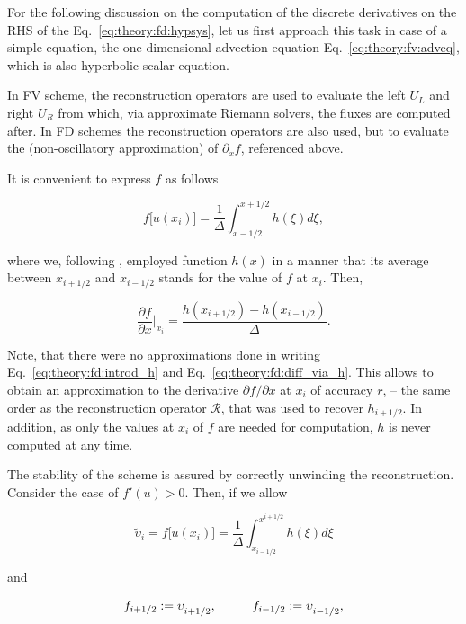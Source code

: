 For the following discussion on the computation of the discrete derivatives on the \ac{RHS} of the Eq.~\eqref{eq:theory:fd:hypsys}, let us first approach this task in case of a simple equation, the one-dimensional advection equation Eq.~\eqref{eq:theory:fv:adveq}, which is also hyperbolic scalar equation. 

In \ac{FV} scheme, the reconstruction operators are used to evaluate the left $U_L$ and right $U_R$ from which, via approximate Riemann solvers, the fluxes are computed after. In \ac{FD} schemes the reconstruction operators are also used, but to evaluate the (non-oscillatory approximation) of $\partial_x f$, referenced above. 

It is convenient to express $f$ as follows

\begin{equation}
f\big[u(x_i)\big] = \frac{1}{\Delta}\int_{x-1/2}^{x+1/2}h(\xi)d\xi,
\label{eq:theory:fd:introd_h}
\end{equation}

where we, following \citet{Shu:1988}, employed function $h(x)$ in a manner that its average between $x_{i+1/2}$ and $x_{i-1/2}$ stands for the value of $f$ at $x_i$. Then, 

\begin{equation}
\frac{\partial f}{\partial x}\Big|_{x_i} = \frac{h(x_{i+1/2}) - h(x_{i-1/2})}{\Delta}.
\label{eq:theory:fd:diff_via_h}
\end{equation}

Note, that there were no approximations done in writing Eq.~\eqref{eq:theory:fd:introd_h} and Eq.~\eqref{eq:theory:fd:diff_via_h}. This allows to obtain an approximation to the derivative $\partial f/\partial x$ at $x_i$ of accuracy $r$, -- the same order as the reconstruction operator $\mathcal{R}$, that was used to recover $h_{i+1/2}$. In addition, as only the values at $x_i$ of $f$ are needed for computation, $h$ is never computed at any time. 

The stability of the scheme is assured by correctly unwinding the reconstruction. 
Consider the case of $f'(u)>0$. 
Then, if we allow

\begin{equation}
\widetilde{\upsilon}_i = f\big[u(x_i)\big] = \frac{1}{\Delta}\int_{x_{i-1/2}}^{x^{i+1/2}}h(\xi)d \xi
\end{equation}

and 

\begin{equation}
f_{i+1/2} := \upsilon_{i+1/2} ^{-}, \hspace{10mm} f_{i-1/2} := \upsilon_{i-1/2} ^{-},
\end{equation}

